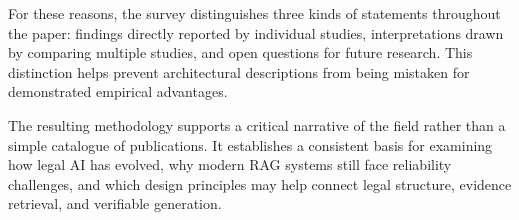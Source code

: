 For these reasons, the survey distinguishes three kinds of statements throughout the paper:
findings directly reported by individual studies, interpretations drawn by comparing multiple
studies, and open questions for future research. This distinction helps prevent architectural
descriptions from being mistaken for demonstrated empirical advantages.

The resulting methodology supports a critical narrative of the field rather than a simple catalogue
of publications. It establishes a consistent basis for examining how legal AI has evolved, why
modern RAG systems still face reliability challenges, and which design principles may help connect
legal structure, evidence retrieval, and verifiable generation.
